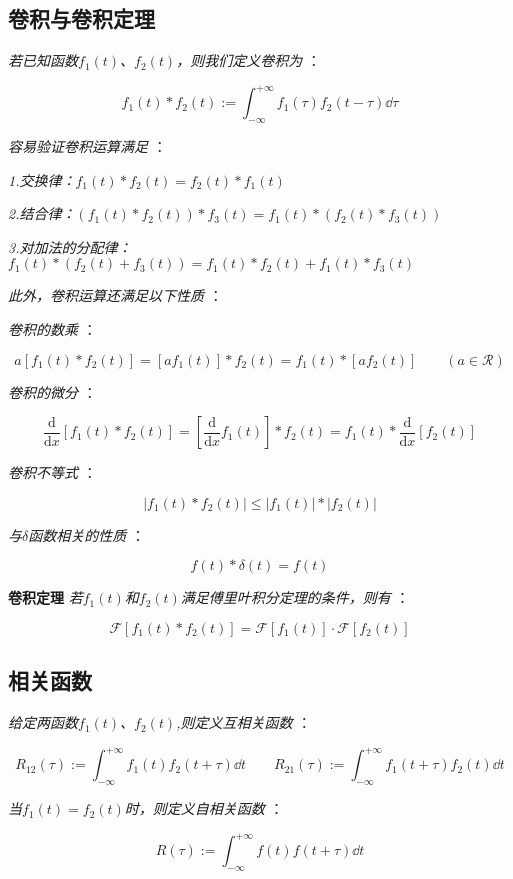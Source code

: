 \subsection{卷积与卷积定理}

\textit{若已知函数$f_1(t)$、$f_2(t)$，则我们定义卷积为 }：

\[f_1(t)\ast f_2(t):=\int_{-\infty}^{+\infty}f_1(\tau)f_2(t-\tau)\dd{\tau} \tag{p}\] 

\textit{容易验证卷积运算满足 }：

\textit{1.交换律：$f_1(t)\ast f_2(t)=f_2(t)\ast f_1(t)$}

\textit{2.结合律：$(f_1(t) \ast f_2(t)) \ast f_3(t)=f_1(t) \ast (f_2(t) \ast f_3(t))$}

\textit{3.对加法的分配律：$f_1(t) \ast (f_2(t)+f_3(t))=f_1(t) \ast f_2(t)+f_1(t) \ast f_3(t)$}

\textit{此外，卷积运算还满足以下性质 } ：

\textit{卷积的数乘 }：

\[a[f_1(t)\ast f_2(t)]=[af_1(t)]\ast f_2(t)=f_1(t)\ast [af_2(t)] \qquad (a \in \mathcal{R})\]

\textit{卷积的微分 }：

\[\frac{\mathrm {d}}{\mathrm {d}x}[f_1(t)\ast f_2(t)]=[\frac{\mathrm {d}}{\mathrm {d}x}f_1(t)]\ast f_2(t)=f_1(t)\ast\frac{\mathrm {d}}{\mathrm {d}x}[ f_2(t)]\]

\textit{卷积不等式 }：

\[|f_1(t)\ast f_2(t)| \leqslant |f_1(t)|\ast |f_2(t)|\]

\textit{与$\delta$函数相关的性质 }：

\[f(t) \ast \delta(t)=f(t)\]

\textbf{卷积定理} \qquad \textit{若$f_1(t)$和$f_2(t)$满足傅里叶积分定理的条件，则有 }：

\[\mathcal{F}[f_1(t) \ast f_2(t)]=\mathcal{F}[f_1(t)] \cdot \mathcal{F}[f_2(t)]\]

\subsection{相关函数}

\textit{给定两函数$f_1(t)$、$f_2(t)$,则定义互相关函数 }：

\[R_{12}(\tau):=\int_{-\infty}^{+\infty}f_1(t)f_2(t+\tau)\dd{t} \qquad R_{21}(\tau):=\int_{-\infty}^{+\infty}f_1(t+\tau)f_2(t)\dd{t}\]

\textit{当$f_1(t)=f_2(t)$时，则定义自相关函数 }：

\[R(\tau):=\int_{-\infty}^{+\infty}f(t)f(t+\tau)\dd{t}\]

